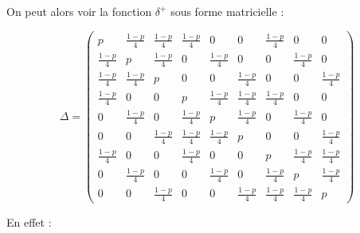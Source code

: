 \documentclass{article}
\begin{document}
On peut alors voir la fonction $\delta^+$ sous forme matricielle :
 
$$ \Delta =  \begin{pmatrix} p & \frac{1-p}{4} & \frac{1-p}{4} & \frac{1-p}{4} & 0 & 0 & \frac{1-p}{4} & 0 & 0 \\
							\frac{1-p}{4} & p & \frac{1-p}{4} & 0 & \frac{1-p}{4} & 0 & 0 & \frac{1-p}{4} & 0 \\
							\frac{1-p}{4} & \frac{1-p}{4} & p & 0 & 0 & \frac{1-p}{4} & 0 & 0 & \frac{1-p}{4} \\
							\frac{1-p}{4} & 0 & 0 & p & \frac{1-p}{4} & \frac{1-p}{4} & \frac{1-p}{4} & 0 & 0 \\
							0 & \frac{1-p}{4} & 0 & \frac{1-p}{4} & p & \frac{1-p}{4} & 0 & \frac{1-p}{4} & 0 \\
							0 & 0 & \frac{1-p}{4} & \frac{1-p}{4} & \frac{1-p}{4} & p & 0 & 0 & \frac{1-p}{4} \\
							\frac{1-p}{4} & 0 & 0 & \frac{1-p}{4} & 0 & 0 & p & \frac{1-p}{4} & \frac{1-p}{4} \\
							0 & \frac{1-p}{4} & 0 & 0 & \frac{1-p}{4} & 0 & \frac{1-p}{4} & p & \frac{1-p}{4} \\
							0 & 0 & \frac{1-p}{4} & 0 & 0 & \frac{1-p}{4} & \frac{1-p}{4} & \frac{1-p}{4} & p
			\end{pmatrix}$$

En effet : \\
\end{document}
